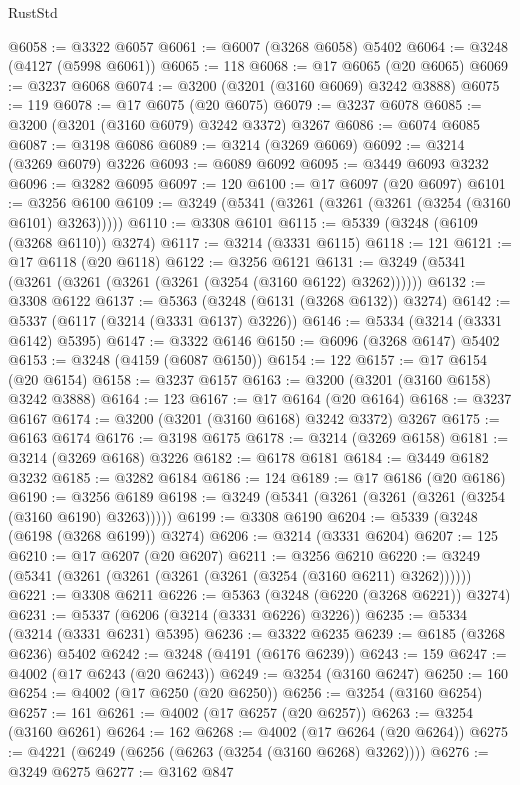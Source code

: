\begin{lexlean}{RustStd}
\begin{coremodule}
@6058 := @3322 @6057
@6061 := @6007 (@3268 @6058) @5402
@6064 := @3248 (@4127 (@5998 @6061))
@6065 := 118
@6068 := @17 @6065 (@20 @6065)
@6069 := @3237 @6068
@6074 := @3200 (@3201 (@3160 @6069) @3242 @3888)
@6075 := 119
@6078 := @17 @6075 (@20 @6075)
@6079 := @3237 @6078
@6085 := @3200 (@3201 (@3160 @6079) @3242 @3372) @3267
@6086 := @6074 @6085
@6087 := @3198 @6086
@6089 := @3214 (@3269 @6069)
@6092 := @3214 (@3269 @6079) @3226
@6093 := @6089 @6092
@6095 := @3449 @6093 @3232
@6096 := @3282 @6095
@6097 := 120
@6100 := @17 @6097 (@20 @6097)
@6101 := @3256 @6100
@6109 := @3249 (@5341 (@3261 (@3261 (@3261 (@3254 (@3160 @6101) @3263)))))
@6110 := @3308 @6101
@6115 := @5339 (@3248 (@6109 (@3268 @6110)) @3274)
@6117 := @3214 (@3331 @6115)
@6118 := 121
@6121 := @17 @6118 (@20 @6118)
@6122 := @3256 @6121
@6131 := @3249 (@5341 (@3261 (@3261 (@3261 (@3261 (@3254 (@3160 @6122) @3262))))))
@6132 := @3308 @6122
@6137 := @5363 (@3248 (@6131 (@3268 @6132)) @3274)
@6142 := @5337 (@6117 (@3214 (@3331 @6137) @3226))
@6146 := @5334 (@3214 (@3331 @6142) @5395)
@6147 := @3322 @6146
@6150 := @6096 (@3268 @6147) @5402
@6153 := @3248 (@4159 (@6087 @6150))
@6154 := 122
@6157 := @17 @6154 (@20 @6154)
@6158 := @3237 @6157
@6163 := @3200 (@3201 (@3160 @6158) @3242 @3888)
@6164 := 123
@6167 := @17 @6164 (@20 @6164)
@6168 := @3237 @6167
@6174 := @3200 (@3201 (@3160 @6168) @3242 @3372) @3267
@6175 := @6163 @6174
@6176 := @3198 @6175
@6178 := @3214 (@3269 @6158)
@6181 := @3214 (@3269 @6168) @3226
@6182 := @6178 @6181
@6184 := @3449 @6182 @3232
@6185 := @3282 @6184
@6186 := 124
@6189 := @17 @6186 (@20 @6186)
@6190 := @3256 @6189
@6198 := @3249 (@5341 (@3261 (@3261 (@3261 (@3254 (@3160 @6190) @3263)))))
@6199 := @3308 @6190
@6204 := @5339 (@3248 (@6198 (@3268 @6199)) @3274)
@6206 := @3214 (@3331 @6204)
@6207 := 125
@6210 := @17 @6207 (@20 @6207)
@6211 := @3256 @6210
@6220 := @3249 (@5341 (@3261 (@3261 (@3261 (@3261 (@3254 (@3160 @6211) @3262))))))
@6221 := @3308 @6211
@6226 := @5363 (@3248 (@6220 (@3268 @6221)) @3274)
@6231 := @5337 (@6206 (@3214 (@3331 @6226) @3226))
@6235 := @5334 (@3214 (@3331 @6231) @5395)
@6236 := @3322 @6235
@6239 := @6185 (@3268 @6236) @5402
@6242 := @3248 (@4191 (@6176 @6239))
@6243 := 159
@6247 := @4002 (@17 @6243 (@20 @6243))
@6249 := @3254 (@3160 @6247)
@6250 := 160
@6254 := @4002 (@17 @6250 (@20 @6250))
@6256 := @3254 (@3160 @6254)
@6257 := 161
@6261 := @4002 (@17 @6257 (@20 @6257))
@6263 := @3254 (@3160 @6261)
@6264 := 162
@6268 := @4002 (@17 @6264 (@20 @6264))
@6275 := @4221 (@6249 (@6256 (@6263 (@3254 (@3160 @6268) @3262))))
@6276 := @3249 @6275
@6277 := @3162 @847

\end{coremodule}
\end{lexlean}
